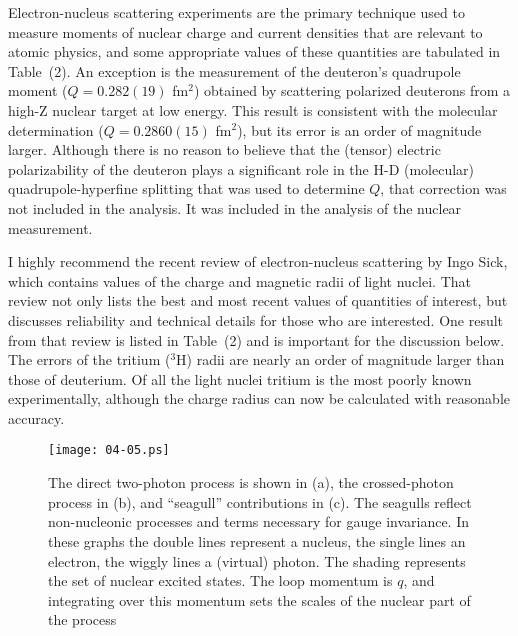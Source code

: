 \documentclass{svmult}
\begin{document}
Electron-nucleus scattering experiments are
the primary technique used to measure moments of nuclear charge and current 
densities that are relevant to atomic physics\cite{ingo}, and some appropriate
values of these quantities are tabulated in Table~(2). An exception is the 
measurement of the deuteron's quadrupole 
moment ($Q = 0.282(19)$ fm$^2$) 
obtained by scattering polarized deuterons from a high-Z nuclear target 
at low energy\cite{Qnuc}.  This result is consistent with the molecular
determination ($Q = 0.2860(15)$ fm$^2$)\cite{Qhd1,Qhd2}, but its error is an 
order of magnitude larger. Although there is no reason to believe that the 
(tensor) electric polarizability of the
deuteron\cite{tau} plays a significant role in the H-D (molecular)
quadrupole-hyperfine splitting that was
used to determine $Q$, that correction was not included in the analysis. It was
included in the analysis of the nuclear measurement.

I highly recommend the recent review of electron-nucleus
scattering by Ingo Sick\cite{ingo}, which
contains values of the charge and magnetic radii of light nuclei.  That review
not only lists the best and most recent values of quantities of interest, but
discusses reliability and technical details for those who are interested. One
result from that review is listed in Table~(2) and is important for the
discussion below.  The errors of the tritium ($^3$H)
radii are nearly an order of magnitude larger than
those of deuterium.  Of all the light nuclei tritium is the most poorly known
experimentally, although the charge radius can now be calculated with reasonable
accuracy.

\begin{figure}
  \centering
  \texttt{[image: 04-05.ps]}
  \caption{The direct two-photon process is shown in (a), the crossed-photon
   process in (b), and ``seagull'' contributions in (c). The seagulls reflect 
   non-nucleonic processes and terms necessary for gauge invariance. In these 
   graphs the double lines represent a nucleus, the single lines an electron, 
   the wiggly lines a (virtual) photon. The shading represents the set of 
   nuclear excited states. The loop momentum is $q$, and integrating over this 
   momentum sets the scales of the nuclear part of the process}
\end{figure}
\end{document}
